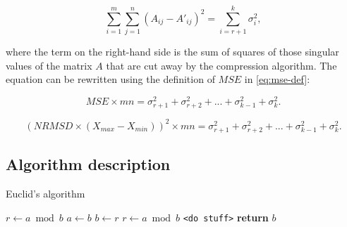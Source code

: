 \begin{itemize}
\begin{equation}
\sum_{i=1}^{m} \sum_{j=1}^{n} (A_{ij} - A'_{ij})^{2} = \sum_{i=r+1}^{k}{\sigma_{i}^{2}},
\end{equation}

where the term on the right-hand side is the sum of squares of those singular values of the matrix $A$ that are cut away by the compression algorithm. The equation can be rewritten using the definition of $MSE$ in \eqref{eq:mse-def}:

\begin{equation}
MSE \times m n = \sigma_{r+1}^{2} + \sigma_{r+2}^{2} + ... + \sigma_{k-1}^{2} + \sigma_{k}^2.
\end{equation}

\begin{equation}
(NRMSD \times (X_{max}-X_{min}))^{2} \times m n = \sigma_{r+1}^{2} + \sigma_{r+2}^{2} + ... + \sigma_{k-1}^{2} + \sigma_{k}^2.
\end{equation}


\end{itemize}


\subsection{Algorithm description}


\begin{algorithm}
  \caption{Euclid’s algorithm}\label{euclid}
  \begin{algorithmic}[1]
      \State $r\gets a\bmod b$
        \State $a\gets b$
        \State $b\gets r$
        \State $r\gets a\bmod b$
      \EndWhile\label{euclidendwhile}
        \State \texttt{<do stuff>}
      \EndFor
      \State \textbf{return} $b$
    \EndProcedure
  \end{algorithmic}
\end{algorithm}

